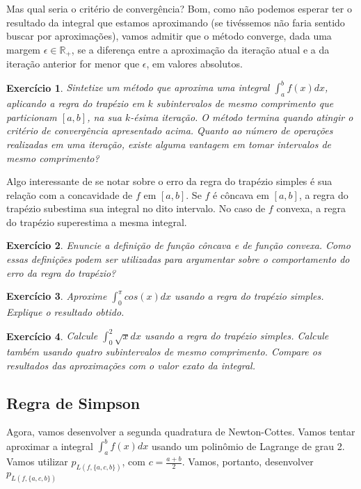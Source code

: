 \documentclass[]{article}
\newtheorem{exercicio}{Exercício}
\numberwithin{equation}{section}
\begin{document}
Mas qual seria o critério de convergência? Bom, como não podemos esperar ter o resultado da integral que estamos aproximando (se tivéssemos não faria sentido buscar por aproximações), vamos admitir que o método converge, dada uma margem $\epsilon \in \mathbb{R}_+$, se a diferença entre a aproximação da iteração atual e a da iteração anterior for menor que $\epsilon$, em valores absolutos.

\begin{exercicio} \label{exercicioRegraTrapezioImplementacao}
	Sintetize um método que aproxima uma integral $\int_{a}^{b} f(x) dx$, aplicando a regra do trapézio em $k$ subintervalos de mesmo comprimento que particionam $[a, b]$, na sua $k$-ésima iteração. O método termina quando atingir o critério de convergência apresentado acima. Quanto ao número de operações realizadas em uma iteração, existe alguma vantagem em tomar intervalos de mesmo comprimento?
\end{exercicio}

Algo interessante de se notar sobre o erro da regra do trapézio simples é sua relação com a concavidade de $f$ em $[a, b]$. Se $f$ é côncava em $[a, b]$, a regra do trapézio subestima sua integral no dito intervalo. No caso de $f$ convexa, a regra do trapézio superestima a mesma integral.

\begin{exercicio}
	Enuncie a definição de função côncava e de função convexa. Como essas definições podem ser utilizadas para argumentar sobre o comportamento do erro da regra do trapézio?
\end{exercicio}

\begin{exercicio}
	Aproxime $\int_{0}^{\pi} cos(x) dx$ usando a regra do trapézio simples. Explique o resultado obtido.
\end{exercicio}

\begin{exercicio}
	Calcule $\int_{0}^{2}\sqrt{x}dx$ usando a regra do trapézio simples. Calcule também usando quatro subintervalos de mesmo comprimento. Compare os resultados das aproximações com o valor exato da integral.
\end{exercicio}

\subsection{Regra de Simpson}

Agora, vamos desenvolver a segunda quadratura de Newton-Cottes. Vamos tentar aproximar a integral $\int_{a}^{b} f(x) dx$ usando um polinômio de Lagrange de grau 2. Vamos utilizar $p_{L(f, \{a, c, b\})}$, com $c = \frac{a + b}{2}$. Vamos, portanto, desenvolver $p_{L(f, \{a, c, b\})}$
\end{document}
